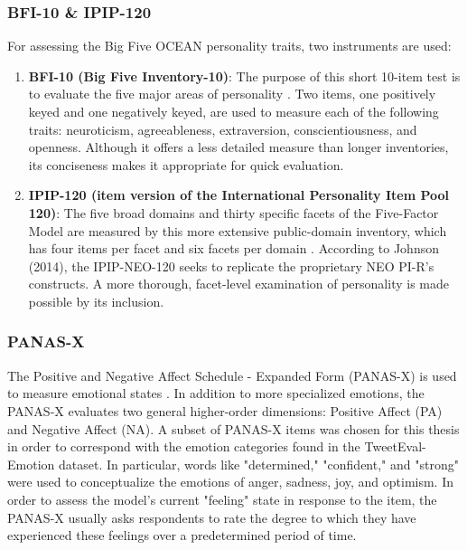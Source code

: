 \documentclass{DESSThesis}
\begin{document}
\subsubsection{BFI-10 \& IPIP-120}
For assessing the Big Five OCEAN personality traits, two instruments are used:
\begin{enumerate}
\item \textbf{BFI-10 (Big Five Inventory-10)}: The purpose of this short 10-item test is to evaluate the five major areas of personality \cite{rammstedt_big_2014}. Two items, one positively keyed and one negatively keyed, are used to measure each of the following traits: neuroticism, agreeableness, extraversion, conscientiousness, and openness. Although it offers a less detailed measure than longer inventories, its conciseness makes it appropriate for quick evaluation.
\item \textbf{IPIP-120 (item version of the International Personality Item Pool 120)}: The five broad domains and thirty specific facets of the Five-Factor Model are measured by this more extensive public-domain inventory, which has four items per facet and six facets per domain \cite{johnson_measuring_2014,maples_test_2014}. According to Johnson (2014), the IPIP-NEO-120 seeks to replicate the proprietary NEO PI-R's constructs. A more thorough, facet-level examination of personality is made possible by its inclusion.
\end{enumerate}

\subsubsection{PANAS-X}
The Positive and Negative Affect Schedule - Expanded Form (PANAS-X) is used to measure emotional states \cite{david_watson_panas-x_1994}. In addition to more specialized emotions, the PANAS-X evaluates two general higher-order dimensions: Positive Affect (PA) and Negative Affect (NA). A subset of PANAS-X items was chosen for this thesis in order to correspond with the emotion categories found in the TweetEval-Emotion dataset. In particular, words like "determined," "confident," and "strong" were used to conceptualize the emotions of anger, sadness, joy, and optimism. In order to assess the model's current "feeling" state in response to the item, the PANAS-X usually asks respondents to rate the degree to which they have experienced these feelings over a predetermined period of time.
\end{document}

